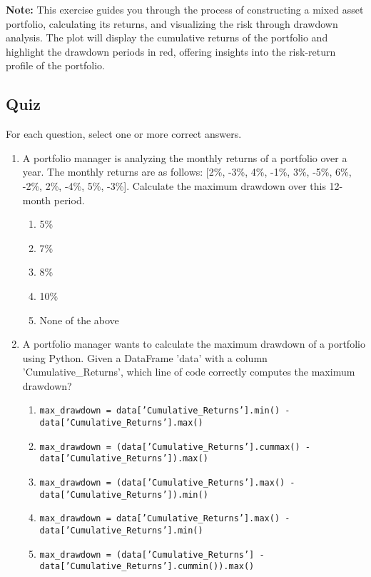 \documentclass{article}
\begin{document}
\textbf{Note:} This exercise guides you through the process of constructing a mixed asset portfolio, calculating its returns, and visualizing the risk through drawdown analysis. The plot will display the cumulative returns of the portfolio and highlight the drawdown periods in red, offering insights into the risk-return profile of the portfolio.

\subsection{Quiz}
For each question, select one or more correct answers.

\begin{enumerate}

    \item A portfolio manager is analyzing the monthly returns of a portfolio over a year. The monthly returns are as follows: [2\%, -3\%, 4\%, -1\%, 3\%, -5\%, 6\%, -2\%, 2\%, -4\%, 5\%, -3\%]. Calculate the maximum drawdown over this 12-month period.
        \begin{enumerate}
            \item 5\%
            \item 7\%
            \item 8\%
            \item 10\%
            \item None of the above
        \end{enumerate}

    \item A portfolio manager wants to calculate the maximum drawdown of a portfolio using Python. Given a DataFrame 'data' with a column 'Cumulative\_Returns', which line of code correctly computes the maximum drawdown?
        \begin{enumerate}
            \item \texttt{max\_drawdown = data['Cumulative\_Returns'].min() - \\ data['Cumulative\_Returns'].max()}
            \item \texttt{max\_drawdown = (data['Cumulative\_Returns'].cummax() - \\ data['Cumulative\_Returns']).max()}
            \item \texttt{max\_drawdown = (data['Cumulative\_Returns'].max() - \\ data['Cumulative\_Returns']).min()}
            \item \texttt{max\_drawdown = data['Cumulative\_Returns'].max() - \\ data['Cumulative\_Returns'].min()}
            \item \texttt{max\_drawdown = (data['Cumulative\_Returns'] - \\ data['Cumulative\_Returns'].cummin()).max()}
        \end{enumerate}

\end{enumerate}
\end{document}

